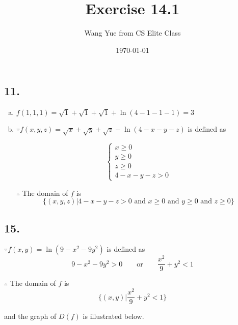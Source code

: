 \documentclass{article}
\begin{document}
    \title{Exercise 14.1}
    \author{Wang Yue from CS Elite Class}
    \date{\today}
    \maketitle

    \subsection*{11. }

    \begin{enumerate}[(a)]
        \item $f(1, 1, 1) = \sqrt 1 +\sqrt 1 +\sqrt 1 + \ln (4 - 1 - 1 - 1) = 3$
        \item 
        $\because f(x, y, z) = \sqrt x + \sqrt y + \sqrt z - \ln(4 - x - y - z)$ is defined as

        $$\left\{ \begin{array}{ll} x \geq 0 \\ y \geq 0 \\ z \geq 0 \\ 4 - x - y - z > 0 \end{array}\right.$$

        $\therefore$ The domain of $f$ is $$\{  (x, y, z) | 4 -x - y - z > 0 \textrm{ and } x \geq 0 \textrm{ and } y \geq 0 \textrm{ and } z \geq 0\}$$
    \end{enumerate}

    \subsection*{15. }
    $\because f(x, y) = \ln(9 - x^2 - 9y^2)$ is defined as $$9 - x^2 - 9y^2 > 0\qquad \textrm{or} \qquad \frac{x^2}{9} + y^2 < 1$$

    $\therefore$ The domain of $f$ is $$\{ (x, y) | \frac{x^2}{9} + y^2 < 1 \}$$

    and the graph of $D(f)$ is illustrated below.
\end{document}
